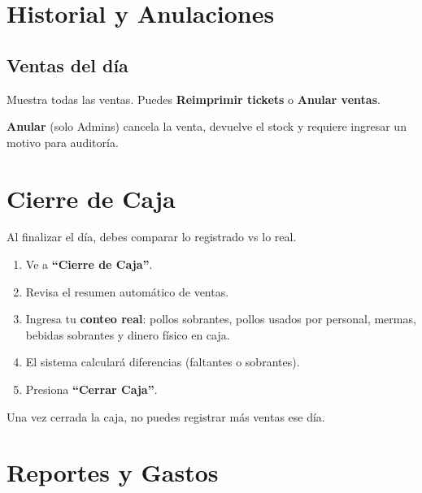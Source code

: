 \documentclass[10pt,a4paper,twoside]{article}
\begin{document}
\section{Historial y Anulaciones}

\subsection{Ventas del día}
Muestra todas las ventas. Puedes \textbf{Reimprimir tickets} o \textbf{Anular ventas}.

\begin{dangerbox}
\textbf{Anular} (solo Admins) cancela la venta, devuelve el stock y requiere ingresar un motivo para auditoría.
\end{dangerbox}

\section{Cierre de Caja}

Al finalizar el día, debes comparar lo registrado vs lo real.

\begin{stepbox}
\begin{enumerate}[itemsep=1pt, leftmargin=15pt]
    \item Ve a \textbf{``Cierre de Caja''}.
    \item Revisa el resumen automático de ventas.
    \item Ingresa tu \textbf{conteo real}: pollos sobrantes, pollos usados por personal, mermas, bebidas sobrantes y dinero físico en caja.
    \item El sistema calculará diferencias (faltantes o sobrantes).
    \item Presiona \textbf{``Cerrar Caja''}.
\end{enumerate}
\end{stepbox}

\begin{warningbox}
Una vez cerrada la caja, no puedes registrar más ventas ese día.
\end{warningbox}

\section{Reportes y Gastos}
\end{document}
